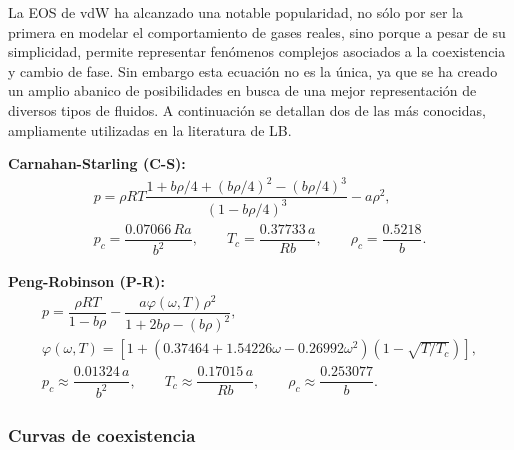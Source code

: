 La EOS de vdW ha alcanzado una notable popularidad, no s\'olo por ser la primera en modelar el comportamiento de gases reales, sino porque a pesar de su simplicidad, permite representar fen\'omenos complejos asociados a la coexistencia y cambio de fase. Sin embargo esta ecuaci\'on no es la \'unica, ya que se ha creado un amplio abanico de posibilidades en busca de una mejor representaci\'on de diversos tipos de fluidos. A continuaci\'on se detallan dos de las m\'as conocidas, ampliamente utilizadas en la literatura de LB.

\smallskip
\textbf{Carnahan-Starling (C-S):}
\begin{equation}
	\begin{gathered}
		p = \rho R T\dfrac{1+b\rho/4+(b\rho/4)^2-(b\rho/4)^3}{(1-b\rho/4)^3} - a\rho^2, \\[2mm]
		p_c = \dfrac{0.07066 \, Ra}{b^2}, \qquad T_c = \dfrac{0.37733 \, a}{Rb}, \qquad \rho_c = \dfrac{0.5218}{b}.
	\end{gathered}
	\label{eq:CS_eos}
\end{equation}


\textbf{Peng-Robinson (P-R):}
\begin{equation}
	\begin{gathered}
		p = \dfrac{\rho R T}{1-b\rho} - \dfrac{a\varphi(\omega,T)\rho^2}{1+2b\rho-(b\rho)^2}, \\[0mm]
		\varphi(\omega,T) = \left[ 1+(0.37464+1.54226\omega-0.26992\omega^2)(1-\sqrt{T/T_c})\right], \\[0mm]
		p_c \approx \dfrac{0.01324 \, a}{b^2}, \qquad
		T_c \approx \dfrac{0.17015 \, a}{Rb}, \qquad
		\rho_c \approx \dfrac{0.253077}{b}.
	\end{gathered}
	\label{eq:PR_eos}
\end{equation}



\subsubsection*{Curvas de coexistencia}

